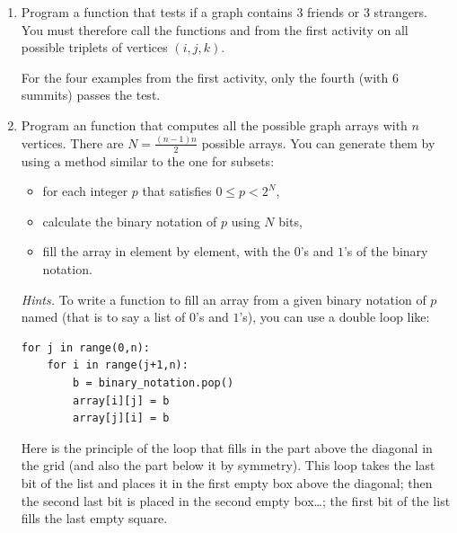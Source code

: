 \documentclass[11pt,class=report,crop=false]{standalone}
\begin{document}
\begin{activite}[Ramsey's theorem for $n=6$]


\begin{enumerate}
  \item Program a  function that tests if a graph contains $3$ friends or $3$ strangers. You must therefore call the functions  and  from the first activity on all possible triplets of vertices $(i,j,k)$.
 
 For the four examples from the first activity, only the fourth (with $6$ summits) passes the test.
  
  \item Program an  function that computes all the possible graph arrays with $n$ vertices. There are $N = \frac{(n-1)n}{2}$ possible arrays. You can generate them by using a method similar to the one for subsets:
  \begin{itemize}
    \item for each integer $p$ that satisfies $0 \le p < 2^N$,
    \item calculate the binary notation of $p$ using $N$ bits,
    \item fill the array in element by element, with the $0$'s and $1$'s of the binary notation.
  \end{itemize}


\emph{Hints.}
To write a function to fill an array from a given binary notation of $p$ named  (that is to say a list of $0$'s and $1$'s), you can use a double loop like:

\begin{lstlisting}
for j in range(0,n):
    for i in range(j+1,n):
        b = binary_notation.pop()
        array[i][j] = b
        array[j][i] = b
\end{lstlisting}
  
Here is the principle of the loop that fills in the part above the diagonal in the grid (and also the part below it by symmetry).
This loop takes the last bit of the list and places it in the first empty box above the diagonal; then the second last bit is placed in the second empty box\ldots; the first bit of the list fills the last empty square.


  

\end{enumerate}
\end{activite}
\end{document}
